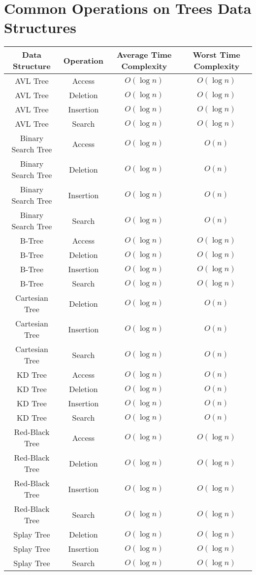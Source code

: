 \documentclass{article}
\begin{document}
\newpage
\section*{Common Operations on Trees Data Structures}

\begin{table}[ht]
	\centering
	\scriptsize
	\begin{tabular}{c ccc}
		Data Structure & Operation & Average Time Complexity & Worst Time Complexity \\
		\hline
		AVL Tree & Access & $O(\log{n})$ & $O(\log{n})$ \\
		AVL Tree & Deletion & $O(\log{n})$ & $O(\log{n})$ \\
		AVL Tree & Insertion & $O(\log{n})$ & $O(\log{n})$ \\
		AVL Tree & Search & $O(\log{n})$ & $O(\log{n})$ \\
		Binary Search Tree & Access & $O(\log{n})$ & $O(n)$ \\
		Binary Search Tree & Deletion & $O(\log{n})$ & $O(n)$ \\
		Binary Search Tree & Insertion & $O(\log{n})$ & $O(n)$ \\
		Binary Search Tree & Search & $O(\log{n})$ & $O(n)$ \\
		B-Tree & Access & $O(\log{n})$ & $O(\log{n})$ \\
		B-Tree & Deletion & $O(\log{n})$ & $O(\log{n})$ \\
		B-Tree & Insertion & $O(\log{n})$ & $O(\log{n})$ \\
		B-Tree & Search & $O(\log{n})$ & $O(\log{n})$ \\
		Cartesian Tree & Deletion & $O(\log{n})$ & $O(n)$ \\
		Cartesian Tree & Insertion & $O(\log{n})$ & $O(n)$ \\
		Cartesian Tree & Search & $O(\log{n})$ & $O(n)$ \\
		KD Tree & Access & $O(\log{n})$ & $O(n)$ \\
		KD Tree & Deletion & $O(\log{n})$ & $O(n)$ \\
		KD Tree & Insertion & $O(\log{n})$ & $O(n)$ \\
		KD Tree & Search & $O(\log{n})$ & $O(n)$ \\
		Red-Black Tree & Access & $O(\log{n})$ & $O(\log{n})$ \\
		Red-Black Tree & Deletion & $O(\log{n})$ & $O(\log{n})$ \\
		Red-Black Tree & Insertion & $O(\log{n})$ & $O(\log{n})$ \\
		Red-Black Tree & Search & $O(\log{n})$ & $O(\log{n})$ \\
		Splay Tree & Deletion & $O(\log{n})$ & $O(\log{n})$ \\
		Splay Tree & Insertion & $O(\log{n})$ & $O(\log{n})$ \\
		Splay Tree & Search & $O(\log{n})$ & $O(\log{n})$ \\
		\hline
	\end{tabular}
\end{table}
\end{document}
